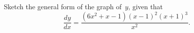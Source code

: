Sketch the general form of the graph of~$y$, given that
\[
\frac{dy}{dx} = \frac{(6x^{2} + x - 1) (x - 1)^{2} (x + 1)^{3}}{x^{2}}.
\]

